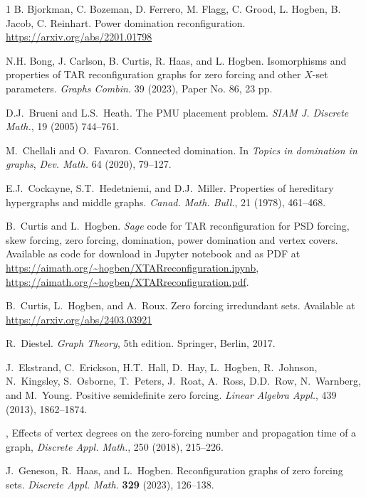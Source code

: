 \documentclass{article}
\numberwithin{figure}{section}
\numberwithin{table}{section}
\numberwithin{equation}{section}
\theoremstyle{definition}
\theoremstyle{definition}
\theoremstyle{definition}
\begin{document}
{\begin{thebibliography}{1}
 B. Bjorkman, C. Bozeman, D. Ferrero, M. Flagg, C. Grood, L. Hogben, B. Jacob, C. Reinhart.  Power domination reconfiguration.  \url{https://arxiv.org/abs/2201.01798} 

 N.H. Bong, J. Carlson, B. Curtis, R. Haas, and L. Hogben. Isomorphisms  and  properties of TAR reconfiguration graphs for zero forcing and other $X$-set parameters.  \emph{Graphs Combin.} {39} (2023), Paper No. 86, 23 pp. 

 D.J.~Brueni and L.S.~Heath. The PMU placement problem. {\em SIAM J. Discrete Math.}, 19 (2005) 744--761. 



    M.~Chellali and O.~Favaron. 
Connected domination. In \emph{Topics in domination in graphs}, \emph{Dev. Math.} 64
(2020), 79–127.

  E.J.~Cockayne, S.T.~Hedetniemi, and D.J.~Miller.
Properties of hereditary hypergraphs and middle graphs.
\emph{Canad. Math. Bull.}, 21 (1978), 461--468.

 B.~Curtis and L.~Hogben. {\em Sage} code for TAR reconfiguration for PSD forcing, skew forcing, zero forcing, domination, power domination and vertex covers.
Available  as code for download in  %
Jupyter notebook and as PDF  at  
\url{https://aimath.org/~hogben/XTARreconfiguration.ipynb}, \url{https://aimath.org/~hogben/XTARreconfiguration.pdf}. 




 B.~Curtis, L.~Hogben, and A.~Roux. Zero forcing irredundant sets.  Available at \url{https://arxiv.org/abs/2403.03921}

  R.~Diestel.  {\em Graph Theory}, 5th edition. Springer, Berlin, 2017.

 J.~Ekstrand, C.~Erickson, H.T.~Hall, D.~Hay, L.~Hogben, R.~Johnson, N.~Kingsley, S.~Osborne, T.~Peters, J.~Roat, A.~Ross, D.D.~Row, N.~Warnberg, and M.~Young.  Positive semidefinite zero forcing.  {\em Linear Algebra Appl.}, 439 (2013), 1862--1874. 

, {Effects of vertex degrees on the  zero-forcing number and propagation time of a graph}, {\em Discrete Appl. Math.}, 250 (2018), 215--226.


  J.~Geneson, R.~Haas, and L.~Hogben. Reconfiguration graphs of   zero forcing sets. {\em Discrete Appl. Math.} {\bf 329} (2023), 126--138. 





\end{thebibliography}}
\end{document}
